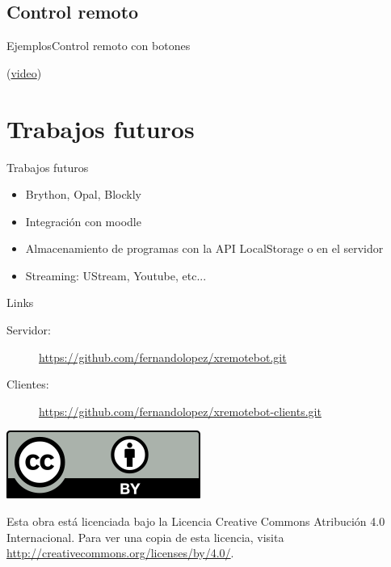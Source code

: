 \documentclass{beamer}
\begin{document}
\subsection{Control remoto}
\begin{frame}[fragile]{Ejemplos}{Control remoto con botones}
    
    (\href{run:ejemplos/botones.mp4}{video})
\end{frame}

\section{Trabajos futuros}
\begin{frame}{Trabajos futuros}
    \begin{itemize}[<+->]
        \item Brython, Opal, Blockly
        \item Integración con moodle
        \item Almacenamiento de programas con la API LocalStorage o en el servidor
        \item Streaming: UStream, Youtube, etc...
    \end{itemize}
\end{frame}



%

\begin{frame}{Links}
    \begin{description}
        \item[Servidor:]
            \href{https://github.com/fernandolopez/xremotebot.git}
            {https://github.com/fernandolopez/xremotebot.git}
        \item[Clientes:]
            \href{https://github.com/fernandolopez/xremotebot-clients.git}
            {https://github.com/fernandolopez/xremotebot-clients.git}
    \end{description}
\end{frame}

\begin{frame}
    \centering
    \includegraphics[width=0.2\linewidth]{images/cc-by}

    Esta obra está licenciada bajo la Licencia Creative Commons Atribución
    4.0 Internacional. Para ver una copia de esta licencia, visita
    \url{http://creativecommons.org/licenses/by/4.0/}.
\end{frame}
\end{document}
